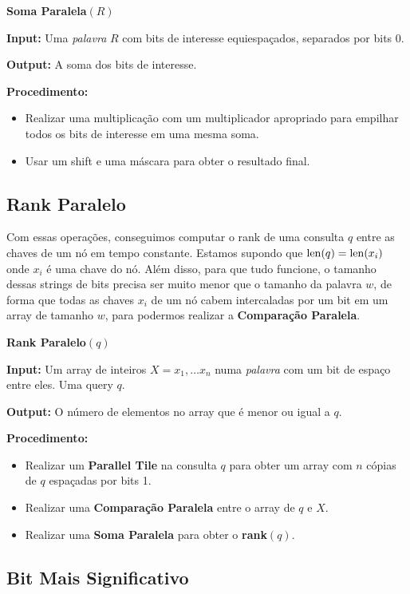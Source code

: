 \textbf{Soma Paralela}$(R)$

\textbf{Input:} Uma \textit{palavra} $R$ com bits de interesse equiespaçados,
separados por bits 0.

\textbf{Output:} A soma dos bits de interesse.

\textbf{Procedimento:} 
\begin{itemize}
\item Realizar uma multiplicação com um multiplicador apropriado para
empilhar todos os bits de interesse em uma mesma soma. 
\item Usar um shift e uma máscara para obter o resultado final.
\end{itemize}

\subsection{Rank Paralelo}

Com essas operações, conseguimos computar o rank de uma consulta $q$ entre as
chaves de um nó em tempo constante. Estamos supondo que $\operatorname{len}(q) = \operatorname{len}(x_i)$
onde $x_i$ é uma chave do nó. Além disso, para que tudo funcione, o tamanho
dessas strings de bits precisa ser muito menor que o tamanho da palavra $w$, de
forma que todas as chaves $x_i$ de um nó cabem intercaladas por um bit em um
array de tamanho $w$, para podermos realizar a \textbf{Comparação Paralela}.

\textbf{Rank Paralelo}$(q)$

\textbf{Input:} Um array de inteiros $X = x_1,\dots x_n$ numa \textit{palavra}
com um bit de espaço entre eles. Uma query $q$.

\textbf{Output:} O número de elementos no array que é menor ou igual a $q$.

\textbf{Procedimento:}
\begin{itemize}
    \item Realizar um \textbf{Parallel Tile} na consulta $q$ para obter um
    array com $n$ cópias de $q$ espaçadas por bits 1.
    \item Realizar uma \textbf{Comparação Paralela} entre o array de $q$ e $X$.
    \item Realizar uma \textbf{Soma Paralela} para obter o \textbf{rank}$(q)$.
\end{itemize}

\subsection{Bit Mais Significativo}

